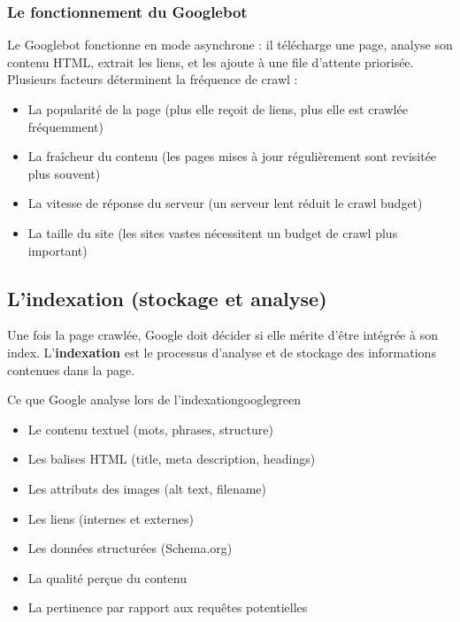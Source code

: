 \documentclass[12pt,a4paper,twoside]{report}
\newcommand{\keyword}[1]{\textbf{\textcolor{googleblue}{#1}}}
\begin{document}
\subsubsection{Le fonctionnement du Googlebot}

Le Googlebot fonctionne en mode asynchrone : il télécharge une page, analyse son contenu HTML, extrait les liens, et les ajoute à une file d'attente priorisée. Plusieurs facteurs déterminent la fréquence de crawl :

\begin{itemize}
    \item La popularité de la page (plus elle reçoit de liens, plus elle est crawlée fréquemment)
    \item La fraîcheur du contenu (les pages mises à jour régulièrement sont revisitée plus souvent)
    \item La vitesse de réponse du serveur (un serveur lent réduit le crawl budget)
    \item La taille du site (les sites vastes nécessitent un budget de crawl plus important)
\end{itemize}

\subsection{L'indexation (stockage et analyse)}

Une fois la page crawlée, Google doit décider si elle mérite d'être intégrée à son index. L'\keyword{indexation} est le processus d'analyse et de stockage des informations contenues dans la page.

\begin{mybox}{Ce que Google analyse lors de l'indexation}{googlegreen}
\begin{itemize}
    \item Le contenu textuel (mots, phrases, structure)
    \item Les balises HTML (title, meta description, headings)
    \item Les attributs des images (alt text, filename)
    \item Les liens (internes et externes)
    \item Les données structurées (Schema.org)
    \item La qualité perçue du contenu
    \item La pertinence par rapport aux requêtes potentielles
\end{itemize}
\end{mybox}
\end{document}

